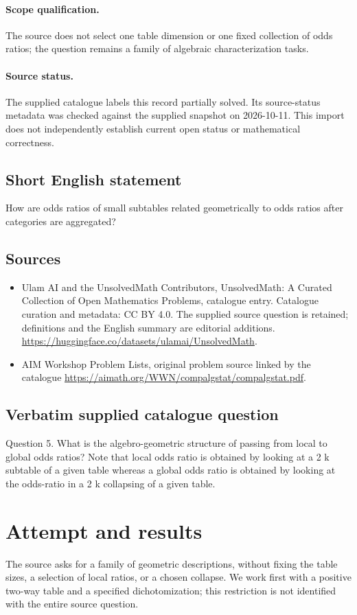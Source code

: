\documentclass[11pt]{article}
\begin{document}
\paragraph{Scope qualification.}
The source does not select one table dimension or one fixed collection of odds ratios; the question remains a family of algebraic characterization tasks.
\paragraph{Source status.}
The supplied catalogue labels this record partially solved. Its source-status metadata was checked against the supplied snapshot on 2026-10-11. This import does not independently establish current open status or mathematical correctness.
\subsection{Short English statement}
How are odds ratios of small subtables related geometrically to odds ratios after categories are aggregated?
\subsection{Sources}
\begin{itemize}
\item[S1] Ulam AI and the UnsolvedMath Contributors, UnsolvedMath: A Curated Collection of Open Mathematics Problems, catalogue entry. Catalogue curation and metadata: CC BY 4.0. The supplied source question is retained; definitions and the English summary are editorial additions.
\url{https://huggingface.co/datasets/ulamai/UnsolvedMath}.
\item[S2] AIM Workshop Problem Lists, original problem source linked by the catalogue
\url{https://aimath.org/WWN/compalgstat/compalgstat.pdf}.
\end{itemize}
\subsection{Verbatim supplied catalogue question}
Question 5. What is the algebro-geometric structure of passing from local to global odds ratios? Note that local odds ratio is obtained by looking at a 2 k subtable of a given table whereas a global odds ratio is obtained by looking at the odds-ratio in a 2 k collapsing of a given table.

\section{Attempt and results}
The source asks for a family of geometric descriptions, without fixing
the table sizes, a selection of local ratios, or a chosen collapse. We
work first with a positive two-way table and a specified dichotomization;
this restriction is not identified with the entire source question.
\end{document}
